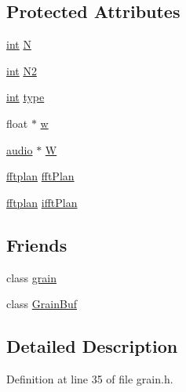 \subsection*{Protected Attributes}
\begin{DoxyCompactItemize}
\item 
\hyperlink{xmltok_8h_a5a0d4a5641ce434f1d23533f2b2e6653}{int} \hyperlink{class__sbsms___1_1_grain_allocator_a5ba148d38f360042f21d828522353fd2}{N}
\item 
\hyperlink{xmltok_8h_a5a0d4a5641ce434f1d23533f2b2e6653}{int} \hyperlink{class__sbsms___1_1_grain_allocator_a19cc9a8c5f0d4ebb834e5ce27f60e135}{N2}
\item 
\hyperlink{xmltok_8h_a5a0d4a5641ce434f1d23533f2b2e6653}{int} \hyperlink{class__sbsms___1_1_grain_allocator_a5ac786aafdb92d5a78a929c6accf48d0}{type}
\item 
float $\ast$ \hyperlink{class__sbsms___1_1_grain_allocator_a218c7900b8b9e679ae4dae3e0014ff96}{w}
\item 
\hyperlink{namespace__sbsms___a11786cc5bd221ff534972ae350477324}{audio} $\ast$ \hyperlink{class__sbsms___1_1_grain_allocator_a67ac7e262b165d86212d5b4bf4d2e1f4}{W}
\item 
\hyperlink{namespace__sbsms___a7f1d3311b2efc8799b5c4bf22942e197}{fftplan} \hyperlink{class__sbsms___1_1_grain_allocator_aa36f193e1597b68dae168f53aa0e24b5}{fft\+Plan}
\item 
\hyperlink{namespace__sbsms___a7f1d3311b2efc8799b5c4bf22942e197}{fftplan} \hyperlink{class__sbsms___1_1_grain_allocator_a4a7b4d63a2cd46a593764a114ca217bc}{ifft\+Plan}
\end{DoxyCompactItemize}
\subsection*{Friends}
\begin{DoxyCompactItemize}
\item 
class \hyperlink{class__sbsms___1_1_grain_allocator_a778c621f37b03d2d17b2eda14d1a069e}{grain}
\item 
class \hyperlink{class__sbsms___1_1_grain_allocator_a79aef3eced47adf79a3580bb9a53c4e3}{Grain\+Buf}
\end{DoxyCompactItemize}


\subsection{Detailed Description}


Definition at line 35 of file grain.\+h.



